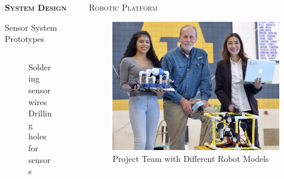 \documentclass[final,t]{beamer}
\begin{document}
\begin{frame}{}
\begin{columns}
\begin{column}{.5\linewidth}
\begin{exampleblock}{\textsc{\textbf{System Design}}}
\begin{block}{Sensor System Prototypes}
\begin{center}
\begin{figure}
\begin{tabular}{cc}
                    \end{tabular}
                    \caption{Soldering sensor wires \hspace{30mm} Drilling holes for sensors}
                    \end{figure}
                    \end{center}

  					\end{block}
                \end{exampleblock}
            \end{column}

            \begin{column}{.5\linewidth}

                \begin{block}{\textsc{Robotic Platform}}
                    \vspace*{3mm}
                    \begin{figure}
                    \centering
                        \includegraphics[scale = 0.9]{assets/group_pic.jpg}
                        \caption{Project Team with Different Robot Models}
                    \end{figure}


\end{block}
\end{column}
\end{columns}
\end{frame}
\end{document}
